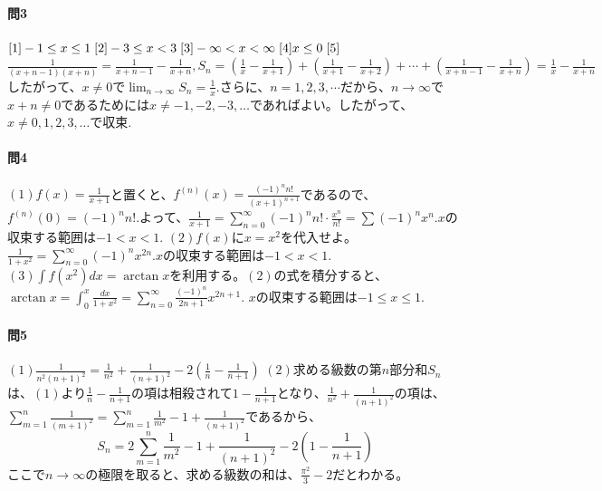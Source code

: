 \documentclass[a4j,dvipdfmx]{jsarticle}
\begin{document}
                    \paragraph{問3}
                        $[1]-1\leq x\leq 1\hspace{1mm}[2]-3\leq x<3\hspace{1mm}[3]-\infty <x<\infty\hspace{1mm}[4]x\leq 0\hspace{1mm}[5]$
                        $\displaystyle \frac{1}{(x+n-1)(x+n)}=\frac{1}{x+n-1}-\frac{1}{x+n},S_n = \left(\frac{1}{x}-\frac{1}{x+1}\right)+\left(\frac{1}{x+1}-\frac{1}{x+2}\right)+\cdots+\left(\frac{1}{x+n-1}-\frac{1}{x+n}\right)=\frac{1}{x}-\frac{1}{x+n}$
                        したがって、$x\neq 0$で$\displaystyle \lim_{n\to\infty}S_n = \frac{1}{x}.$さらに、$n=1,2,3,\cdots$だから、$n\to\infty$で$x+n \neq 0$であるためには$x\neq -1,-2,-3,\dots$であればよい。したがって、$x\neq  0,1,2,3,\dots$で収束.

                    \paragraph{問4}$(1)\displaystyle f(x)=\frac{1}{x+1}$と置くと、$f^{(n)}(x)=\frac{(-1)^nn!}{(x+1)^{n+1}}$であるので、$f^{(n)}(0)=(-1)^nn!.$よって、$\displaystyle \frac{1}{x+1}=\sum_{n=0}^\infty(-1)^n n!\cdot \frac{x^n}{n!}=\sum (-1)^nx^n.$$x$の収束する範囲は$-1< x< 1.$
                    \hspace{1mm}$(2)f(x)$に$x=x^2$を代入せよ。$\displaystyle \frac{1}{1+x^2}=\sum_{n=0}^\infty (-1)^n x^{2n}.$$x$の収束する範囲は$-1<x<1.$
                    \hspace{1mm}$(3)\int f(x^2)dx =\arctan x$を利用する。$(2)$の式を積分すると、$\displaystyle \arctan x = \int_{0}^{x}\frac{dx}{1+x^2}=\sum_{n=0}^{\infty}\frac{(-1)^n}{2n+1}x^{2n+1}.$
                    $x$の収束する範囲は$-1\leq x\leq 1.$

                    \paragraph{問5}$(1)\displaystyle \frac{1}{n^2(n+1)^2}=\frac{1}{n^2}+\frac{1}{(n+1)^2}-2\left(\frac{1}{n}-\frac{1}{n+1}\right)$\hspace{2mm}
                    $(2)$求める級数の第$n$部分和$S_n$は、$(1)$より$\displaystyle \frac{1}{n}-\frac{1}{n+1}$の項は相殺されて$1-\frac{1}{n+1}$となり、$\displaystyle \frac{1}{n^2}+\frac{1}{(n+1)^2}$の項は、
                    $\displaystyle \sum_{m=1}^{n}\frac{1}{(m+1)^2}=\sum_{m=1}^{n}\frac{1}{m^2}-1+\frac{1}{(n+1)^2}$であるから、
                    \begin{equation*}
                        S_n = 2\sum_{m=1}^{n}\frac{1}{m^2}-1+\frac{1}{(n+1)^2}-2\left(1-\frac{1}{n+1}\right)
                    \end{equation*}
                    ここで$n\to \infty$の極限を取ると、求める級数の和は、$\frac{\pi^2}{3}-2$だとわかる。
\end{document}
